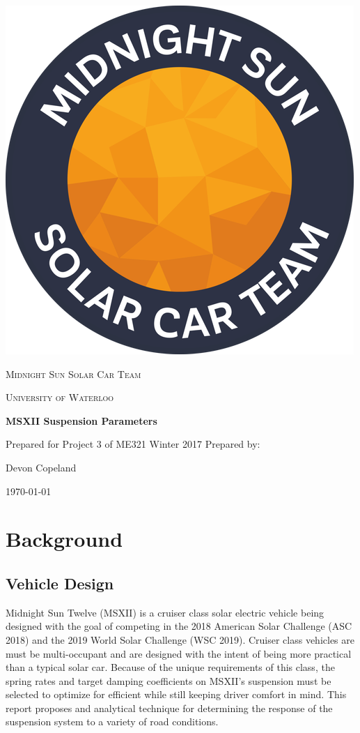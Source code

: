 \documentclass[12pt]{article}
\begin{document}
\begin{titlepage}
	\vspace*{3cm}
	\centering
	\includegraphics[width=.25\textwidth]{./LaTex/midnightSunLogoCircle.png}\par
	\vspace{1.5cm}
	{\scshape\LARGE Midnight Sun Solar Car Team \par}
	{\scshape\large University of Waterloo\par}
	\vspace{3.5cm}
	{\huge\bfseries MSXII Suspension Parameters\par}
	\vspace{0.2cm}
	\large Prepared for Project 3 of ME321 Winter 2017
	\vfill
	Prepared by:\par
	Devon Copeland\par
	\vspace{1cm}
	\today\par
\end{titlepage}

\section{Background}
\subsection{Vehicle Design}
Midnight Sun Twelve (MSXII) is a cruiser class solar electric vehicle being designed with the goal of competing in the 2018 American Solar Challenge (ASC 2018) and the 2019 World Solar Challenge (WSC 2019). Cruiser class vehicles are must be multi-occupant and are designed with the intent of being more practical than a typical solar car. Because of the unique requirements of this class, the spring rates and target damping coefficients on MSXII's suspension must be selected to optimize for efficient while still keeping driver comfort in mind. This report proposes and analytical technique for determining the response of the suspension system to a variety of road conditions. 
\end{document}
